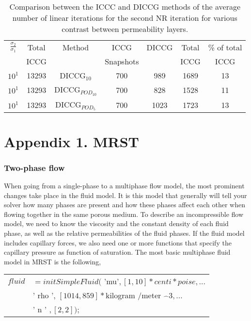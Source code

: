 \documentclass[a4paper,10pt]{report}
\begin{document}
\begin{table}[!ht]\centering
\begin{minipage}{1\textwidth}
 \centering
\begin{tabular}{ ||c|c||c|c|c|c|c||} 
\hline
$\frac{\sigma_2}{\sigma_1}$&Total&Method  & ICCG&DICCG &Total&\% of total\\ 
                           & ICCG     &  & Snapshots& &ICCG& ICCG\\ 
\hline 
\hline 
$10^{1}$ &13293& DICCG$_{10}$&700&989&1689&13\\ 
\hline  
$10^{1}$ &13293& DICCG$_{POD_{10}}$&700&828&1528&11 \\ 
\hline  
$10^{1}$ &13293& DICCG$_{POD_{5}}$&700&1023&1723&13 \\ 
\hline  
\end{tabular} 
\caption{Comparison between the ICCC and DICCG methods of the average number of linear iterations for the second NR iteration for various contrast between permeability layers. }\label{table:litertot2} 
\end{minipage}  
\end{table}  



\appendix
\section*{Appendix 1. MRST}\label{a1}
\subsubsection{Two-phase flow}
When going from a single-phase to a multiphase flow model, the most prominent changes take place in the fluid model. It is this model that generally will
tell your solver how many phases are present and how these phases affect each
other when flowing together in the same porous medium. 
To describe an incompressible flow model, we need to know the viscosity
and the constant density of each fluid phase, as well as the relative permeabilities of the fluid phases. If the fluid model includes capillary forces, we also need one or more functions that specify the capillary pressure as function of saturation. The most basic multiphase fluid model in MRST is the following,
\begin{table}[!ht]
\centering
\begin{tabular}{ |cl |} 
\hline
$fluid$ &$= initSimpleFluid($ 'mu'$ , [ 1, 10]*centi* poise, ...$\\
&' rho ',  $ [1014, 859 ] * $kilogram /meter $\hat{ \text{ }} 3, ...$\\
&' n ' $, [ 2,2]);$\\
 \hline
\end{tabular}
\label{table:fluid}
\end{table}  
\end{document}
